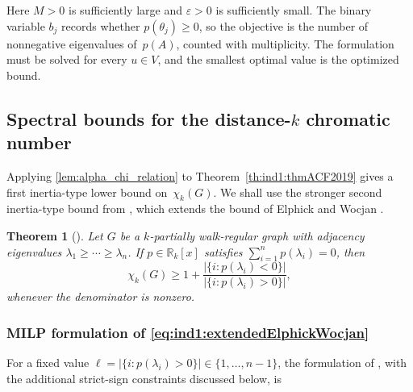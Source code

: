 \documentclass[10pt]{article}
\newtheorem{theorem}{Theorem}[section]
\newcommand{\RR}{\mathds{R}}
\begin{document}
Here \(M>0\) is sufficiently large and \(\varepsilon>0\) is sufficiently small. The binary variable \(b_j\) records whether \(p(\theta_j)\geq0\), so the objective is the number of nonnegative eigenvalues of~\(p(A)\), counted with multiplicity. The formulation must be solved for every \(u\in V\), and the smallest optimal value is the optimized bound.

\subsection{Spectral bounds for the distance-\(k\) chromatic number}
\label{sec:ind1:newboundschik}

Applying \eqref{lem:alpha_chi_relation} to Theorem~\ref{th:ind1:thmACF2019} gives a first inertia-type lower bound on~\(\chi_k(G)\). We shall use the stronger second inertia-type bound from \cite{acfns2020}, which extends the bound of Elphick and Wocjan \cite{elphick}.

\begin{theorem}[]
\label{th:ind1:extended-EW}
Let \(G\) be a \(k\)-partially walk-regular graph with adjacency eigenvalues \(\lambda_1\geq\cdots\geq\lambda_n\). If \(p\in\RR_k[x]\) satisfies \(\sum_{i=1}^n p(\lambda_i)=0\), then
\begin{equation}\label{eq:ind1:extendedElphickWocjan}
    \chi_k(G)\geq
    1+\frac{|\{i:p(\lambda_i)<0\}|}
            {|\{i:p(\lambda_i)>0\}|},
\end{equation}
whenever the denominator is nonzero.
\end{theorem}

\subsubsection*{MILP formulation of
\eqref{eq:ind1:extendedElphickWocjan}}
\label{subsec:ind1:optsecondinertialbound}
\label{sec:ind1:inertia2}

For a fixed value \(\ell=|\{i:p(\lambda_i)>0\}|\in\{1,\ldots,n-1\}\), the formulation of \cite{acfns2020}, with the additional strict-sign constraints discussed below, is
\end{document}
